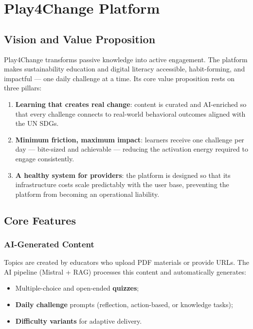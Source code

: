 %
%
\chapter{Play4Change Platform}
\label{cha:platform}

\section{Vision and Value Proposition}
\label{sec:vision}

Play4Change transforms passive knowledge into active engagement. The platform makes sustainability education and digital literacy accessible, habit-forming, and impactful — one daily challenge at a time. Its core value proposition rests on three pillars:

\begin{enumerate}
    \item \textbf{Learning that creates real change}: content is curated and AI-enriched so that every challenge connects to real-world behavioral outcomes aligned with the UN SDGs.
    \item \textbf{Minimum friction, maximum impact}: learners receive one challenge per day — bite-sized and achievable — reducing the activation energy required to engage consistently.
    \item \textbf{A healthy system for providers}: the platform is designed so that its infrastructure costs scale predictably with the user base, preventing the platform from becoming an operational liability.
\end{enumerate}

\section{Core Features}
\label{sec:features}

\subsection{AI-Generated Content}
\label{ssec:ai_content}

Topics are created by educators who upload PDF materials or provide URLs. The AI pipeline (Mistral + RAG) processes this content and automatically generates:
\begin{itemize}
    \item Multiple-choice and open-ended \textbf{quizzes};
    \item \textbf{Daily challenge} prompts (reflection, action-based, or knowledge tasks);
    \item \textbf{Difficulty variants} for adaptive delivery.
\end{itemize}

